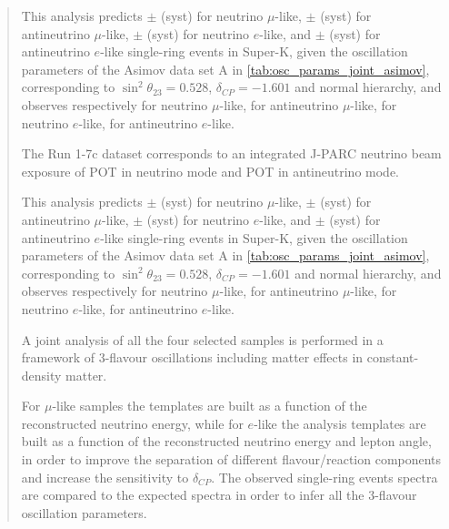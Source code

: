 \begin{frontmatter}
\begin{abstract}
This analysis predicts 
\NskOscExpectationNumuRunOneSevenB{} $\pm$ \NskOscExpectationNumuErrorRunOneSevenB{} (syst) for neutrino $\mu$-like,
\NskOscExpectationNumuBarRunOneSevenB{} $\pm$ \NskOscExpectationNumuBarErrorRunOneSevenB{} (syst) for antineutrino $\mu$-like,
\NskOscExpectationNueRunOneSevenB{} $\pm$ \NskOscExpectationNueErrorRunOneSevenB{} (syst) for neutrino $e$-like,
and
\NskOscExpectationNueBarRunOneSevenB{} $\pm$ \NskOscExpectationNueBarErrorRunOneSevenB{} (syst) for antineutrino $e$-like
single-ring events in Super-K,
given the oscillation parameters of the Asimov data set A in \cref{tab:osc_params_joint_asimov},
corresponding to $\sin^2 \theta_{23} = 0.528$, $\delta_{CP} = -1.601$ and normal hierarchy, 
and observes respectively 
\NskObservedNumuRunOneSevenB{} for neutrino $\mu$-like,
\NskObservedNumuBarRunOneSevenB{}  for antineutrino $\mu$-like,
\NskObservedNueRunOneSevenB{}  for neutrino $e$-like,
\NskObservedNueBarRunOneSevenB{}  for antineutrino $e$-like.


The Run 1-7c dataset corresponds to an integrated J-PARC neutrino beam
exposure of \TotalPotNuRunOneSevenC{} POT in neutrino mode and
\TotalPotNuBarRunOneSevenC{} POT in antineutrino mode.

This analysis predicts 
\NskOscExpectationNumuRunOneSevenC{} $\pm$ \NskOscExpectationNumuErrorRunOneSevenC{} (syst) for neutrino $\mu$-like,
\NskOscExpectationNumuBarRunOneSevenC{} $\pm$ \NskOscExpectationNumuBarErrorRunOneSevenC{} (syst) for antineutrino $\mu$-like,
\NskOscExpectationNueRunOneSevenC{} $\pm$ \NskOscExpectationNueErrorRunOneSevenC{} (syst) for neutrino $e$-like,
and
\NskOscExpectationNueBarRunOneSevenC{} $\pm$ \NskOscExpectationNueBarErrorRunOneSevenC{} (syst) for antineutrino $e$-like
single-ring events in Super-K,
given the oscillation parameters of the Asimov data set A in \cref{tab:osc_params_joint_asimov},
corresponding to $\sin^2 \theta_{23} = 0.528$, $\delta_{CP} = -1.601$ and normal hierarchy, 
and observes respectively 
\NskObservedNumuRunOneSevenC{} for neutrino $\mu$-like,
\NskObservedNumuBarRunOneSevenC{}  for antineutrino $\mu$-like,
\NskObservedNueRunOneSevenC{}  for neutrino $e$-like,
\NskObservedNueBarRunOneSevenC{}  for antineutrino $e$-like.



A joint analysis of all the four selected samples is performed 
in a framework of 3-flavour oscillations including matter effects in constant-density matter.

For $\mu$-like samples the templates are built as a function of the reconstructed neutrino energy,
while for $e$-like the analysis templates are built as a function of the reconstructed neutrino energy and lepton angle,
in order to improve the separation of different flavour/reaction components
and increase the sensitivity to $\delta_{CP}$.
The observed single-ring events spectra are compared to the expected spectra 
in order to infer all the 3-flavour oscillation parameters.


\end{abstract}
\end{frontmatter}
